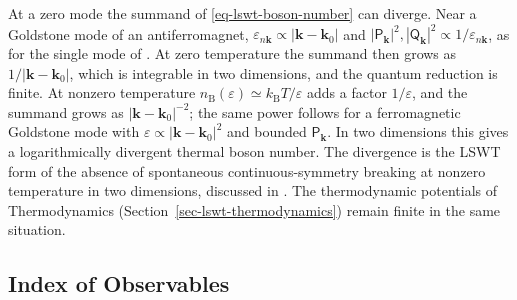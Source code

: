 At a zero mode the summand of \eqref{eq-lswt-boson-number} can diverge. Near a Goldstone mode of an antiferromagnet, \(\varepsilon_{n\mathbf k}\propto|\mathbf k-\mathbf k_0|\) and \(|\mathsf P_{\mathbf k}|^2,|\mathsf Q_{\mathbf k}|^2\propto1/\varepsilon_{n\mathbf k}\), as for the single mode of . At zero temperature the summand then grows as \(1/|\mathbf k-\mathbf k_0|\), which is integrable in two dimensions, and the quantum reduction is finite. At nonzero temperature \(n_{\mathrm B}(\varepsilon)\simeq k_{\mathrm B}T/\varepsilon\) adds a factor \(1/\varepsilon\), and the summand grows as \(|\mathbf k-\mathbf k_0|^{-2}\); the same power follows for a ferromagnetic Goldstone mode with \(\varepsilon\propto|\mathbf k-\mathbf k_0|^2\) and bounded \(\mathsf P_{\mathbf k}\). In two dimensions this gives a logarithmically divergent thermal boson number. The divergence is the LSWT form of the absence of spontaneous continuous-symmetry breaking at nonzero temperature in two dimensions, discussed in . The thermodynamic potentials of Thermodynamics (Section~\ref{sec-lswt-thermodynamics}) remain finite in the same situation.

\subsection{Index of Observables}

